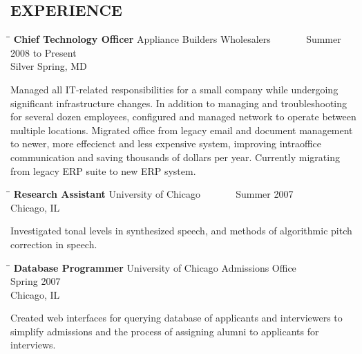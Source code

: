 \documentclass{res}
\begin{document}
\begin{resume}
\section{EXPERIENCE}
   \vspace{-0.1in}	
   \begin{tabbing}
   \hspace{2.3in}\= \hspace{2.6in}\= \kill %
    {\bf Chief Technology Officer} \>Appliance Builders Wholesalers \> ~~~~~~ Summer 2008 to Present\\
                             \>Silver Spring, MD
   \end{tabbing}\vspace{-20pt}      %
    Managed all IT-related responsibilities for a small company while undergoing significant
    infrastructure changes. In addition to managing and troubleshooting for several dozen employees,
    configured and managed network to operate between multiple locations. Migrated office from legacy
    email and document management to newer, more effecienct and less expensive system, improving
    intraoffice communication and saving thousands of dollars per year. Currently migrating from legacy ERP
    suite to new ERP system.
   \begin{tabbing}
   \hspace{2.3in}\= \hspace{2.6in}\= \kill %
    {\bf Research Assistant} \>University of Chicago \> ~~~~~~ Summer 2007\\
                          \>Chicago, IL
   \end{tabbing}\vspace{-20pt}
   Investigated tonal levels in synthesized speech, and methods of algorithmic pitch correction
   in speech.
   \begin{tabbing}
   \hspace{2.3in}\= \hspace{2.6in}\= \kill %
    {\bf Database Programmer } \>University of Chicago Admissions Office \> ~~~~~~ Spring 2007\\
                             \>Chicago, IL
   \end{tabbing}\vspace{-20pt}      %
   Created web interfaces for querying database of applicants and interviewers to simplify admissions and the process of assigning alumni to applicants for interviews.

\end{resume}
\end{document}
